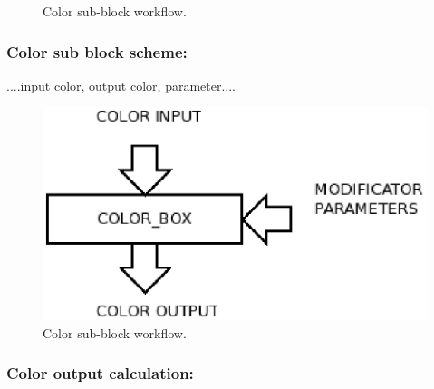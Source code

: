 \documentclass[9pt]{article}
\begin{document}
\begin{figure}[h]
\begin{center}
  \caption{Color sub-block workflow.}
  \label{rect_line_example}
\end{center}
\end{figure}

\subsubsection*{Color sub block scheme:}

....input color, output color, parameter....

\begin{figure}[h]
\begin{center}
  \includegraphics[scale=0.6]{p07.eps}
  \caption{Color sub-block workflow.}
  \label{rect_line_example}
\end{center}
\end{figure}

\subsubsection*{Color output calculation:}
\end{document}
